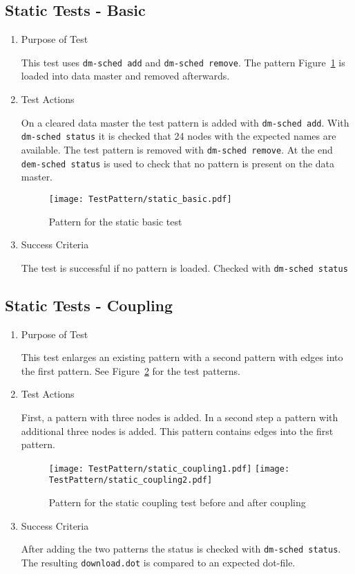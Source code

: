 \subsection{Static Tests - Basic}
\begin{enumerate}
	\item Purpose of Test

	This test uses \texttt{dm-sched add} and \texttt{dm-sched remove}. The pattern Figure~\ref{fig:Pattern_for_the_static_basic_test} 
	is loaded into data master and removed afterwards.
	\item Test Actions

	On a cleared data master the test pattern is added with \texttt{dm-sched add}. With \texttt{dm-sched status} it is checked that 24 nodes with the expected names are available. The test pattern is removed with \texttt{dm-sched remove}. At the end \texttt{dem-sched status} is used to check that no pattern is present on the data master.

    \begin{figure}
        \centering 
        \texttt{[image: TestPattern/static\_basic.pdf]}
        \caption{Pattern for the static basic test}
        \label{fig:Pattern_for_the_static_basic_test}
    \end{figure}
	\item Success Criteria

	The test is successful if no pattern is loaded. Checked with \texttt{dm-sched status}
\end{enumerate}
\subsection{Static Tests - Coupling}
\begin{enumerate}
	\item Purpose of Test

	This test enlarges an existing pattern with a second pattern with edges into the first 
	pattern. See Figure~\ref{fig:Pattern_for_the_static_coupling_test} for the test patterns.
	\item Test Actions

	First, a pattern with three nodes is added. In a second step a pattern with additional three nodes is added. 
	This pattern contains edges into the first pattern.
    \begin{figure}
        \centering 
        \texttt{[image: TestPattern/static\_coupling1.pdf]}
        \texttt{[image: TestPattern/static\_coupling2.pdf]}
        \caption{Pattern for the static coupling test before and after coupling}
        \label{fig:Pattern_for_the_static_coupling_test}
    \end{figure}
	\item Success Criteria

	After adding the two patterns the status is checked with \texttt{dm-sched status}. The resulting \texttt{download.dot} is 
	compared to an expected dot-file.
\end{enumerate}
